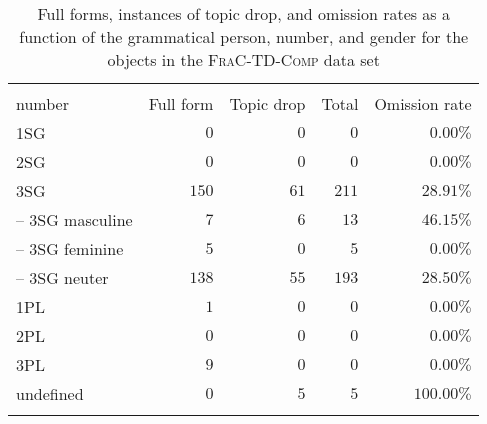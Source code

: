 \begin{table}[t]
\caption{Full forms, instances of topic drop, and omission rates as a function of the grammatical person, number, and gender for the objects in the \textsc{FraC-TD-Comp} data set}
\centering
\begin{tabular}{lrrrr}
\lsptoprule
\Centerstack[c]{Grammatical person,\\number} & \multicolumn{1}{c}{\multirow{-1}{*}{Full form}}  & \multicolumn{1}{c}{\multirow{-1}{*}{Topic drop}} & \multicolumn{1}{c}{\multirow{-1}{*}{Total}} & \multirow{-1}{*}{Omission rate} \\
\midrule
1SG & $0$ & $0$ & $0$ & $0.00\%$ \\
2SG & $0$ & $0$ & $0$ & $0.00\%$ \\
3SG & $150$ & $61$ & $211$  & $28.91\%$\\
-- 3SG masculine & $7$ & $6$ & $13$ & $46.15\%$\\
-- 3SG feminine & $5$ & $0$ & $5$ & $0.00\%$ \\
-- 3SG neuter & $138$ & $55$ & $193$ & $28.50\%$\\
1PL & $1$ & $0$ & $0$  &  $0.00\%$ \\
2PL & $0$ & $0$ & $0$  & $0.00\%$ \\
3PL & $9$ & $0$ & $0$  & $0.00\%$ \\
undefined & $0$ & $5$ & $5$ & $100.00\%$ \\
\lspbottomrule
\end{tabular}
\label{tab:FraC.Comp.person.obj}
\end{table}


